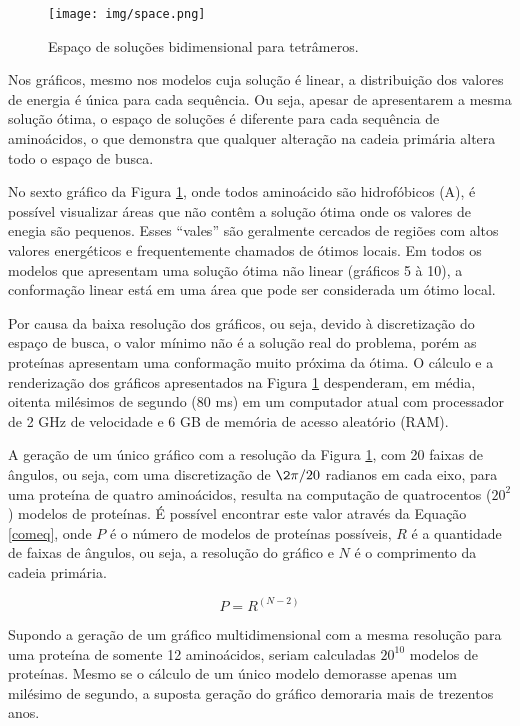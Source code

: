 \documentclass[dm,ppgcomp]{texfurg}
\begin{document}
\begin{figure}[htbp]
  \centering \texttt{[image: img/space.png]}
\caption{Espaço de soluções bidimensional para tetrâmeros.} 
\label{space}
\end{figure}

Nos gráficos, mesmo nos modelos cuja solução é linear, a distribuição dos valores de energia é única para cada sequência. Ou seja, apesar de apresentarem a mesma solução ótima, o espaço de soluções é diferente para cada sequência de aminoácidos, o que demonstra que qualquer alteração na cadeia primária altera todo o espaço de busca.

No sexto gráfico da Figura \ref{space}, onde todos aminoácido são hidrofóbicos (A), é possível visualizar áreas que não contêm a solução ótima onde os valores de enegia são pequenos. Esses “vales”  são geralmente cercados de regiões com altos valores energéticos e frequentemente chamados de ótimos locais. Em todos os modelos que apresentam uma solução ótima não linear (gráficos 5 à 10), a conformação linear está em uma área que pode ser considerada um ótimo local.

Por causa da baixa resolução dos gráficos, ou seja, devido à discretização do espaço de busca, o valor mínimo não é a solução real do problema, porém as proteínas apresentam uma conformação muito próxima da ótima. O cálculo e a renderização dos gráficos apresentados na Figura \ref{space} despenderam, em média, oitenta milésimos de segundo (80 ms) em um computador atual com processador de 2 GHz de velocidade e 6 GB de memória de acesso aleatório (RAM).

A geração de um único gráfico com a resolução da Figura \ref{space}, com 20 faixas de ângulos, ou seja, com uma discretização de $\2\pi / 20$ radianos em cada eixo, para uma proteína de quatro aminoácidos, resulta na computação de quatrocentos ($20^2$) modelos de proteínas. É possível encontrar este valor através da Equação \ref{comeq}, onde $P$ é o número de modelos de proteínas possíveis, $R$ é a quantidade de faixas de ângulos, ou seja, a resolução do gráfico e $N$ é o comprimento da cadeia primária. 

\begin{equation}\label{comeq}
P = { R }^{ (N - 2) }
\end{equation}

Supondo a geração de um gráfico multidimensional com a mesma resolução para uma proteína de somente 12 aminoácidos, seriam calculadas $20^{10}$ modelos de proteínas. Mesmo se o cálculo de um único modelo demorasse apenas um milésimo de segundo, a suposta geração do gráfico demoraria mais de trezentos anos. 
\end{document}
